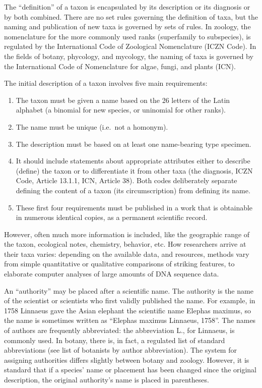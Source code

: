 \documentclass[]{book}
\providecommand{\tightlist}{%
  \setlength{\itemsep}{0pt}\setlength{\parskip}{0pt}}
\theoremstyle{definition}
\theoremstyle{definition}
\theoremstyle{definition}
\theoremstyle{remark}
\begin{document}
\begin{enumerate}
The ``definition'' of a taxon is encapsulated by its description or its
diagnosis or by both combined. There are no set rules governing the
definition of taxa, but the naming and publication of new taxa is
governed by sets of rules. In zoology, the nomenclature for the more
commonly used ranks (superfamily to subspecies), is regulated by the
International Code of Zoological Nomenclature (ICZN Code). In the fields
of botany, phycology, and mycology, the naming of taxa is governed by
the International Code of Nomenclature for algae, fungi, and plants
(ICN).

The initial description of a taxon involves five main requirements:

\begin{enumerate}
\def\labelenumi{\arabic{enumi}.}
\tightlist
\item
  The taxon must be given a name based on the 26 letters of the Latin
  alphabet (a binomial for new species, or uninomial for other ranks).
\item
  The name must be unique (i.e.~not a homonym).
\item
  The description must be based on at least one name-bearing type
  specimen.
\item
  It should include statements about appropriate attributes either to
  describe (define) the taxon or to differentiate it from other taxa
  (the diagnosis, ICZN Code, Article 13.1.1, ICN, Article 38). Both
  codes deliberately separate defining the content of a taxon (its
  circumscription) from defining its name.
\item
  These first four requirements must be published in a work that is
  obtainable in numerous identical copies, as a permanent scientific
  record.
\end{enumerate}

However, often much more information is included, like the geographic
range of the taxon, ecological notes, chemistry, behavior, etc. How
researchers arrive at their taxa varies: depending on the available
data, and resources, methods vary from simple quantitative or
qualitative comparisons of striking features, to elaborate computer
analyses of large amounts of DNA sequence data.

An ``authority'' may be placed after a scientific name. The authority is
the name of the scientist or scientists who first validly published the
name. For example, in 1758 Linnaeus gave the Asian elephant the
scientific name Elephas maximus, so the name is sometimes written as
``Elephas maximus Linnaeus, 1758''. The names of authors are frequently
abbreviated: the abbreviation L., for Linnaeus, is commonly used. In
botany, there is, in fact, a regulated list of standard abbreviations
(see list of botanists by author abbreviation). The system for assigning
authorities differs slightly between botany and zoology. However, it is
standard that if a species' name or placement has been changed since the
original description, the original authority's name is placed in
parentheses.


\end{enumerate}
\end{document}
